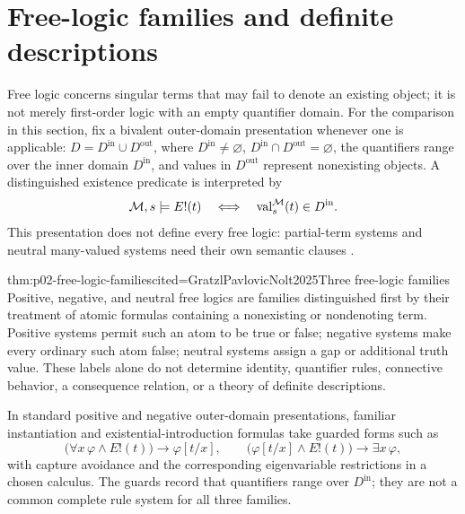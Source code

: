 \section{Free-logic families and definite descriptions}
\label{sec:p02-free-logic}

Free logic concerns singular terms that may fail to denote an existing object;
it is not merely first-order logic with an empty quantifier domain.  For the
comparison in this section, fix a bivalent outer-domain presentation whenever
one is applicable: \(D=D^{\mathrm{in}}\cup D^{\mathrm{out}}\), where
\(D^{\mathrm{in}}\ne\varnothing\),
\(D^{\mathrm{in}}\cap D^{\mathrm{out}}=\varnothing\), the quantifiers range
over the inner domain \(D^{\mathrm{in}}\), and values in
\(D^{\mathrm{out}}\) represent nonexisting objects.  A distinguished
existence predicate is interpreted by
\[
 \mathcal M,s\models E!(t)
 \quad\Longleftrightarrow\quad
 \operatorname{val}^{\mathcal M}_{s}(t)\in D^{\mathrm{in}}.
\]
This presentation does not define every free logic: partial-term systems and
neutral many-valued systems need their own semantic clauses
\cite{GratzlPavlovicNolt2025}.

\begin{hbtheorem}{thm:p02-free-logic-families}{cited=GratzlPavlovicNolt2025}{Three free-logic families}
Positive, negative, and neutral free logics are families distinguished first
by their treatment of atomic formulas containing a nonexisting or nondenoting
term.  Positive systems permit such an atom to be true or false; negative
systems make every ordinary such atom false; neutral systems assign a gap or
additional truth value.  These labels alone do not determine identity,
quantifier rules, connective behavior, a consequence relation, or a theory of
definite descriptions.
\end{hbtheorem}

In standard positive and negative outer-domain presentations, familiar
instantiation and existential-introduction formulas take guarded forms such as
\[
 \bigl(\forall x\,\varphi\land E!(t)\bigr)\to\varphi[t/x],
 \qquad
 \bigl(\varphi[t/x]\land E!(t)\bigr)\to\exists x\,\varphi,
\]
with capture avoidance and the corresponding eigenvariable restrictions in a
chosen calculus.  The guards record that quantifiers range over
\(D^{\mathrm{in}}\); they are not a common complete rule system for all three
families.

